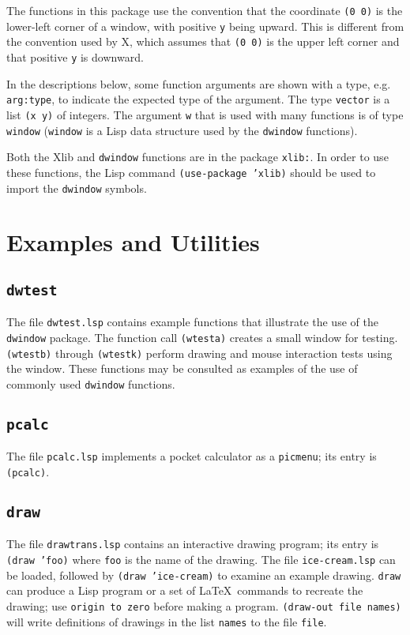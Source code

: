 The functions in this package use the convention that the coordinate
{\tt (0 0)} is the lower-left corner of a window, with positive {\tt y}
being upward.  This is different from the convention used by
X, which assumes that {\tt (0 0)} is the upper left corner and
that positive {\tt y} is downward.

In the descriptions below, some function arguments are shown with a type,
e.g. {\tt arg:type}, to indicate the expected type of the argument.
The type {\tt vector} is a list {\tt (x y)} of integers.  The argument
{\tt w} that is used with many functions is of type {\tt window}
({\tt window} is a Lisp data structure used by the {\tt dwindow} functions).

Both the Xlib and {\tt dwindow} functions are in the package {\tt xlib:}.
In order to use these functions, the Lisp command {\tt (use-package 'xlib)}
should be used to import the {\tt dwindow} symbols.


\section{Examples and Utilities}

\subsection{{\tt dwtest}}

The file {\tt dwtest.lsp} contains example functions that illustrate
the use of the {\tt dwindow} package.  The function call {\tt (wtesta)}
creates a small window for testing.  {\tt (wtestb)} through
{\tt (wtestk)} perform drawing and mouse interaction tests using the
window.  These functions may be consulted as examples of the use of
commonly used {\tt dwindow} functions.

\subsection{{\tt pcalc}}

The file {\tt pcalc.lsp} implements
a pocket calculator as a {\tt picmenu}; its entry is {\tt (pcalc)}.

\subsection{{\tt draw}}

The file {\tt drawtrans.lsp} contains an interactive drawing program;
its entry is {\tt (draw 'foo)} where {\tt foo} is the name of the drawing.
The file {\tt ice-cream.lsp} can be loaded, followed by
{\tt (draw 'ice-cream)} to examine an example drawing.
{\tt draw} can produce a Lisp program or a set of \LaTeX \  commands to
recreate the drawing; use {\tt origin to zero} before making a program.
{\tt (draw-out file names)} will write definitions of drawings in the
list {\tt names} to the file {\tt file}.

